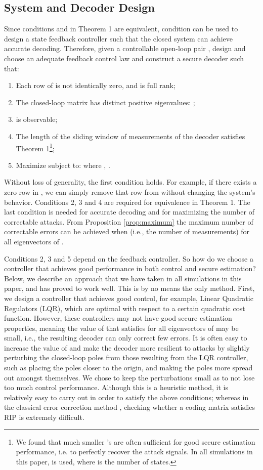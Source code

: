 \documentclass[journal]{IEEEtran}
\begin{document}
\subsection{System and Decoder Design}\label{sec:decoder_design}

Since conditions  and  in Theorem 1 are equivalent, condition  can be used to design a state feedback controller such that the closed system can achieve accurate decoding. Therefore, given a controllable open-loop pair , design  and choose an adequate feedback control law  and construct a secure decoder such that:
\begin{enumerate}
	\item Each row of  is not identically zero, and  is full rank;
	\item The closed-loop matrix  has  distinct positive eigenvalues: ;
	\item  is observable;
	\item The length of the sliding window of measurements  of the decoder satisfies Theorem 1\footnote{We found that much smaller 's are often sufficient for good secure estimation performance, i.e. to perfectly recover the attack signals. In all simulations in this paper,  is used, where  is the number of states.};
	\item Maximize  subject to:  where , .
\end{enumerate}
Without loss of generality, the first condition holds. For example, if there exists a zero row in , we can simply remove that row from  without changing the system's behavior. Conditions 2, 3 and 4 are required for equivalence in Theorem 1. The last condition is needed for accurate decoding and for maximizing the number of correctable attacks. From Proposition \ref{prop:maximum} the maximum number of correctable errors can be achieved when  (i.e., the number of measurements) for all eigenvectors of . 

Conditions 2, 3 and 5 depend on the feedback controller. So how do we choose a controller that achieves good performance in both control and secure estimation? Below, we describe an approach that we have taken in all simulations in this paper, and has proved to work well. This is by no means the only method. First, we design a controller that achieves good control, for example, Linear Quadratic Regulators (LQR), which are optimal with respect to a certain quadratic cost function. However, these controllers may not have good secure estimation properties, meaning the value of  that satisfies  for all eigenvectors of  may be small, i.e., the resulting decoder can only correct few errors. It is often easy to increase the value of  and make the decoder more resilient to attacks by slightly perturbing the closed-loop poles from those resulting from the LQR controller, such as placing the poles closer to the origin, and making the poles more spread out amongst themselves. We chose to keep the perturbations small as to not lose too much control performance.  
Although this is a heuristic method, it is relatively easy to carry out in order to satisfy the above conditions; whereas in the classical error correction method \cite{Candes_Tao}, checking whether a coding matrix satisfies RIP is extremely difficult.
\end{document}
